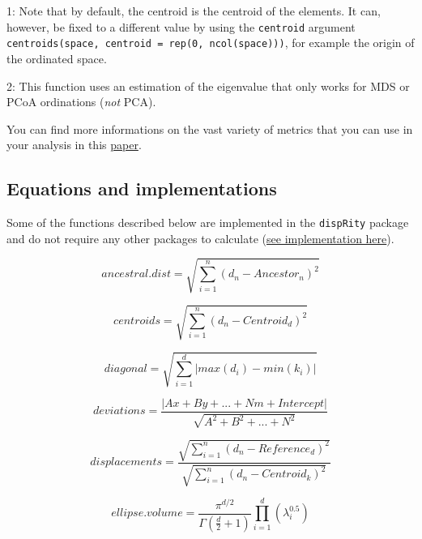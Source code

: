 \documentclass[
]{book}
\begin{document}
1: Note that by default, the centroid is the centroid of the elements.
It can, however, be fixed to a different value by using the \texttt{centroid} argument \texttt{centroids(space,\ centroid\ =\ rep(0,\ ncol(space)))}, for example the origin of the ordinated space.

2: This function uses an estimation of the eigenvalue that only works for MDS or PCoA ordinations (\emph{not} PCA).

You can find more informations on the vast variety of metrics that you can use in your analysis in this \href{https://onlinelibrary.wiley.com/doi/10.1002/ece3.6452}{paper}.

\hypertarget{equations-and-implementations}{%
\subsection{Equations and implementations}\label{equations-and-implementations}}

Some of the functions described below are implemented in the \texttt{dispRity} package and do not require any other packages to calculate (\href{https://github.com/TGuillerme/dispRity/blob/master/R/dispRity.metric.R}{see implementation here}).

\begin{equation}
    ancestral.dist = \sqrt{\sum_{i=1}^{n}{({d}_{n}-Ancestor_{n})^2}}
\end{equation}

\begin{equation}
    centroids = \sqrt{\sum_{i=1}^{n}{({d}_{n}-Centroid_{d})^2}}
\end{equation}

\begin{equation}
    diagonal = \sqrt{\sum_{i=1}^{d}|max(d_i) - min(k_i)|}
\end{equation}

\begin{equation}
    deviations = \frac{|Ax + By + ... + Nm + Intercept|}{\sqrt{A^2 + B^2 + ... + N^2}}
\end{equation}

\begin{equation}
    displacements = \frac{\sqrt{\sum_{i=1}^{n}{({d}_{n}-Reference_{d})^2}}}{\sqrt{\sum_{i=1}^{n}{({d}_{n}-Centroid_{k})^2}}}
\end{equation}

\begin{equation}
    ellipse.volume = \frac{\pi^{d/2}}{\Gamma(\frac{d}{2}+1)}\displaystyle\prod_{i=1}^{d} (\lambda_{i}^{0.5})
\end{equation}
\end{document}
